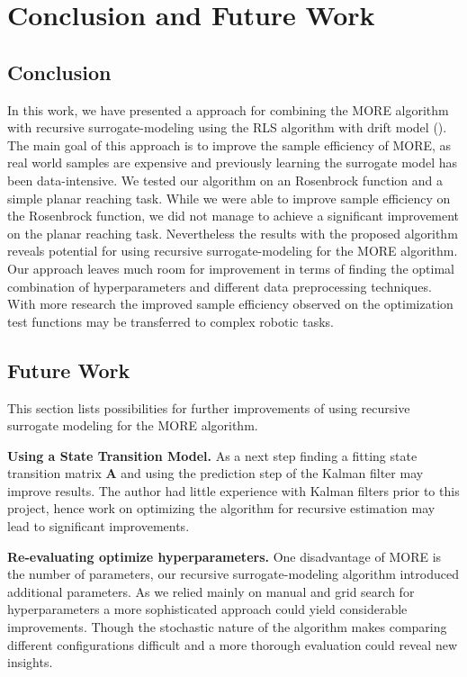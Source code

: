 
\chapter{Conclusion and Future Work}


\section{Conclusion}
In this work, we have presented a approach for combining the MORE algorithm
\citep{abdolmaleki2015model} with recursive surrogate-modeling
using the RLS algorithm with drift model ().
The main goal of this approach is to improve the sample efficiency of
MORE, as real world samples are expensive and
previously learning the surrogate model has been data-intensive.
We tested our algorithm on an Rosenbrock function and
a simple planar reaching task.
While we were able to improve sample efficiency on the Rosenbrock
function, we did not manage to achieve a
significant improvement on the planar reaching task.
Nevertheless the results with the proposed algorithm reveals potential for
using recursive surrogate-modeling for the MORE algorithm.
Our approach leaves much room for improvement in terms of finding
the optimal combination of hyperparameters and different data
preprocessing techniques.
With more research the improved sample efficiency observed
on the optimization test functions may be transferred to
complex robotic tasks.

\section{Future Work}
This section lists possibilities for further improvements of using
recursive surrogate modeling for the MORE algorithm.

\textbf{Using a State Transition Model.}
As a next step finding a fitting state transition matrix $\mathbf{A}$ and
using the prediction step of the Kalman filter may improve results. 
The author had little experience with Kalman filters prior
to this project, hence work on optimizing the algorithm for
recursive estimation may lead to significant improvements.

\textbf{Re-evaluating optimize hyperparameters.}
One disadvantage of MORE is the number of parameters, our
recursive surrogate-modeling algorithm introduced additional parameters.
As we relied mainly on manual and grid search for hyperparameters a
more sophisticated approach could yield considerable improvements.
Though the stochastic nature of the algorithm makes comparing
different configurations difficult and a more thorough evaluation
could reveal new insights.

